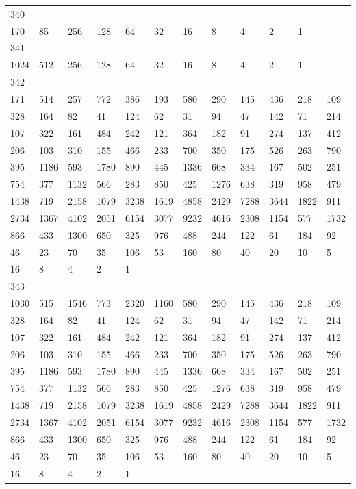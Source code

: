 \begin{longtable}{llllllllllll}
340&&&&&&&&&&&\\
170& 85& 256& 128& 64& 32& 16& 8& 4& 2& 1& \\

341&&&&&&&&&&&\\
1024& 512& 256& 128& 64& 32& 16& 8& 4& 2& 1& \\

342&&&&&&&&&&&\\
171& 514& 257& 772& 386& 193& 580& 290& 145& 436& 218& 109\\
328& 164& 82& 41& 124& 62& 31& 94& 47& 142& 71& 214\\
107& 322& 161& 484& 242& 121& 364& 182& 91& 274& 137& 412\\
206& 103& 310& 155& 466& 233& 700& 350& 175& 526& 263& 790\\
395& 1186& 593& 1780& 890& 445& 1336& 668& 334& 167& 502& 251\\
754& 377& 1132& 566& 283& 850& 425& 1276& 638& 319& 958& 479\\
1438& 719& 2158& 1079& 3238& 1619& 4858& 2429& 7288& 3644& 1822& 911\\
2734& 1367& 4102& 2051& 6154& 3077& 9232& 4616& 2308& 1154& 577& 1732\\
866& 433& 1300& 650& 325& 976& 488& 244& 122& 61& 184& 92\\
46& 23& 70& 35& 106& 53& 160& 80& 40& 20& 10& 5\\
16& 8& 4& 2& 1& \\

343&&&&&&&&&&&\\
1030& 515& 1546& 773& 2320& 1160& 580& 290& 145& 436& 218& 109\\
328& 164& 82& 41& 124& 62& 31& 94& 47& 142& 71& 214\\
107& 322& 161& 484& 242& 121& 364& 182& 91& 274& 137& 412\\
206& 103& 310& 155& 466& 233& 700& 350& 175& 526& 263& 790\\
395& 1186& 593& 1780& 890& 445& 1336& 668& 334& 167& 502& 251\\
754& 377& 1132& 566& 283& 850& 425& 1276& 638& 319& 958& 479\\
1438& 719& 2158& 1079& 3238& 1619& 4858& 2429& 7288& 3644& 1822& 911\\
2734& 1367& 4102& 2051& 6154& 3077& 9232& 4616& 2308& 1154& 577& 1732\\
866& 433& 1300& 650& 325& 976& 488& 244& 122& 61& 184& 92\\
46& 23& 70& 35& 106& 53& 160& 80& 40& 20& 10& 5\\
16& 8& 4& 2& 1& \\


\end{longtable}
